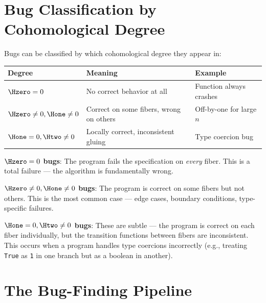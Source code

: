 \section{Bug Classification by Cohomological Degree}

Bugs can be classified by which cohomological degree they appear in:

\begin{center}
\begin{tabular}{l l l}
  \textbf{Degree} & \textbf{Meaning} & \textbf{Example} \\
  \hline
  $\Hzero = 0$ & No correct behavior at all &
    Function always crashes \\
  $\Hzero \neq 0, \Hone \neq 0$ &
    Correct on some fibers, wrong on others &
    Off-by-one for large $n$ \\
  $\Hone = 0, \Htwo \neq 0$ &
    Locally correct, inconsistent gluing &
    Type coercion bug \\
\end{tabular}
\end{center}

\textbf{$\Hzero = 0$ bugs}: The program fails the specification on
\emph{every} fiber.  This is a total failure --- the algorithm is
fundamentally wrong.

\textbf{$\Hzero \neq 0, \Hone \neq 0$ bugs}: The program is correct
on some fibers but not others.  This is the most common case ---
edge cases, boundary conditions, type-specific failures.

\textbf{$\Hone = 0, \Htwo \neq 0$ bugs}: These are subtle --- the
program is correct on each fiber individually, but the transition
functions between fibers are inconsistent.  This occurs when a
program handles type coercions incorrectly (e.g., treating
\texttt{True} as \texttt{1} in one branch but as a boolean in
another).

\section{The Bug-Finding Pipeline}

